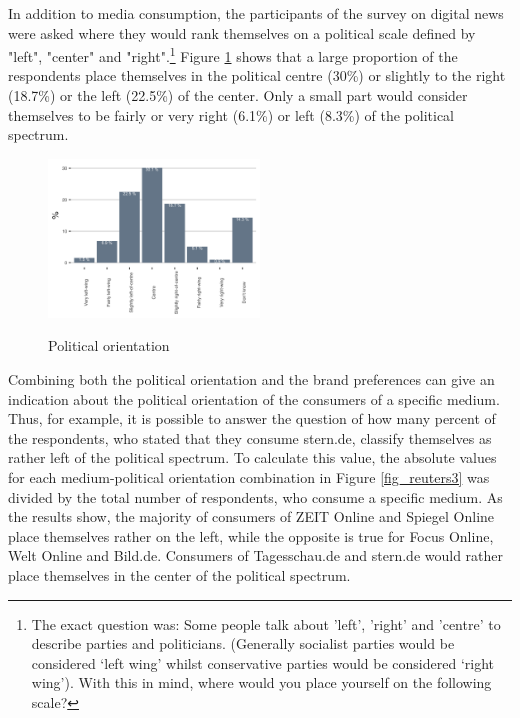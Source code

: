 \documentclass[12pt,a4paper,notitlepage]{article}
\begin{document}
In addition to media consumption, the participants of the survey on digital news were asked where they would rank themselves on a political scale defined by "left", "center" and "right".\footnote{The exact question was: Some people talk about 'left', 'right' and 'centre' to describe parties and politicians. (Generally socialist parties would be considered ‘left wing’ whilst conservative parties would be considered ‘right wing’). With this in mind, where would you place yourself on the following scale?} Figure \ref{fig_reuters2} shows that a large proportion of the respondents place themselves in the political centre (30\%) or slightly to the right (18.7\%) or the left (22.5\%) of the center. Only a small part would consider themselves to be fairly or very right (6.1\%) or left (8.3\%) of the political spectrum.

\begin{figure}[H]
\begin{center}
	\caption{Political orientation }
	\includegraphics[width=0.5\textwidth]{../figs/reuters2}
	\label{fig_reuters2}
	\end{center}
\end{figure}

Combining both the political orientation and the brand preferences can give an indication about the political orientation of the consumers of a specific medium. Thus, for example, it is possible to answer the question of how many percent of the respondents, who stated that they consume stern.de, classify themselves as rather left of the political spectrum. To calculate this value, the absolute values for each medium-political orientation combination in Figure \ref{fig_reuters3} was divided by the total number of respondents, who consume a specific medium. As the results show, the majority of consumers of ZEIT Online and Spiegel Online place themselves rather on the left, while the opposite is true for Focus Online, Welt Online and Bild.de. Consumers of Tagesschau.de and stern.de would rather place themselves in the center of the political spectrum. 
\end{document}
